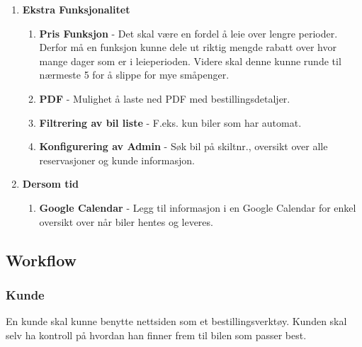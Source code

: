 \begin{enumerate}
  \item \textbf{Ekstra Funksjonalitet}
	\begin{enumerate}
		\item \textbf{Pris Funksjon} - Det skal være en fordel å leie over lengre perioder. Derfor må en funksjon kunne dele ut riktig mengde rabatt over hvor mange dager som er i leieperioden. Videre skal denne kunne runde til nærmeste 5 for å slippe for mye småpenger.
		\item \textbf{PDF} - Mulighet å laste ned PDF med bestillingsdetaljer.
		\item \textbf{Filtrering av bil liste} - F.eks. kun biler som har automat. 
		\item \textbf{Konfigurering av Admin} - Søk bil på skiltnr., oversikt over alle reservasjoner og kunde informasjon.
	\end{enumerate}
  \item \textbf{Dersom tid}
  	\begin{enumerate}
  	\item \textbf{Google Calendar} - Legg til informasjon i en Google Calendar for enkel oversikt over når biler hentes og leveres.
  	\end{enumerate}
 
 \end{enumerate}

\subsection{Workflow}
\subsubsection{Kunde}
En kunde skal kunne benytte nettsiden som et bestillingsverktøy. Kunden skal selv ha kontroll på hvordan han finner frem til bilen som passer best. %
